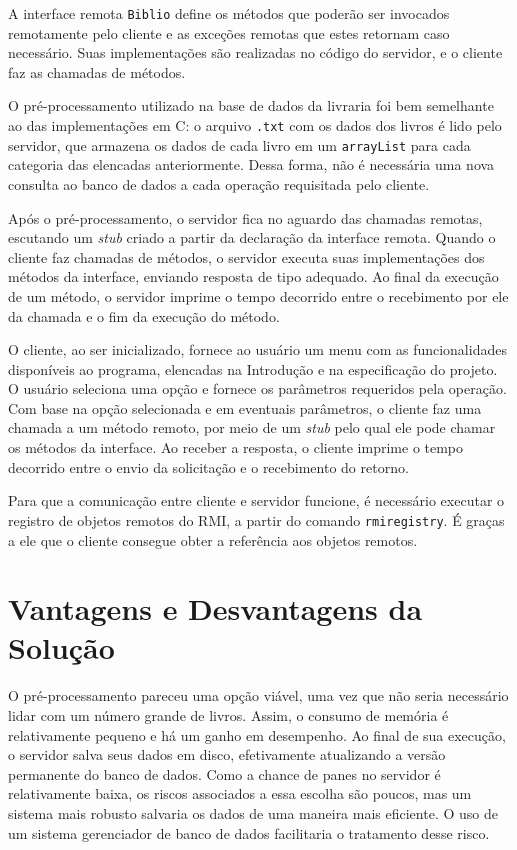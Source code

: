 \documentclass[11pt, brazil]{article} %
\begin{document}
A interface remota \texttt{Biblio} define os métodos que poderão ser invocados remotamente pelo cliente e as exceções remotas que estes retornam caso necessário. Suas implementações são realizadas no código do servidor, e o cliente faz as chamadas de métodos.

O pré-processamento utilizado na base de dados da livraria foi bem semelhante ao das implementações em C: o arquivo \texttt{.txt} com os dados dos livros é lido pelo servidor, que armazena os dados de cada livro em um \texttt{arrayList} para cada categoria das elencadas anteriormente.
Dessa forma, não é necessária uma nova consulta ao banco de dados a cada operação requisitada pelo cliente.

Após o pré-processamento, o servidor fica no aguardo das chamadas remotas, escutando um \emph{stub} criado a partir da declaração da interface remota. Quando o cliente faz chamadas de métodos, o servidor executa suas implementações dos métodos da interface, enviando resposta de tipo adequado. Ao final da execução de um método, o servidor imprime o tempo decorrido entre o recebimento por ele da chamada e o fim da execução do método.

O cliente, ao ser inicializado, fornece ao usuário um menu com as funcionalidades disponíveis
ao programa, elencadas na Introdução e na especificação do projeto. 
O usuário seleciona uma opção e fornece os parâmetros requeridos pela operação.
Com base na opção selecionada e em eventuais parâmetros, o cliente faz uma chamada a um método remoto, por meio de um \emph{stub} pelo qual ele pode chamar os métodos da interface. Ao receber a resposta, o cliente imprime o tempo decorrido entre o envio da solicitação e o recebimento do retorno.

Para que a comunicação entre cliente e servidor funcione, é necessário executar o registro de objetos remotos do RMI, a partir do comando \texttt{rmiregistry}. É graças a ele que o cliente consegue obter a referência aos objetos remotos.

\section{Vantagens e Desvantagens da Solução}

O pré-processamento pareceu uma opção viável, uma vez que não seria necessário lidar com um
número grande de livros. Assim, o consumo de memória é relativamente pequeno e há um ganho em desempenho. 
Ao final de sua execução, o servidor salva seus dados em disco, efetivamente atualizando a versão permanente do banco de dados.
Como a chance de panes no servidor é relativamente baixa, os riscos associados a essa escolha são poucos, mas um sistema mais robusto salvaria os dados de uma maneira mais eficiente. 
O uso de um sistema gerenciador de banco de dados facilitaria o tratamento desse risco.
\end{document}
